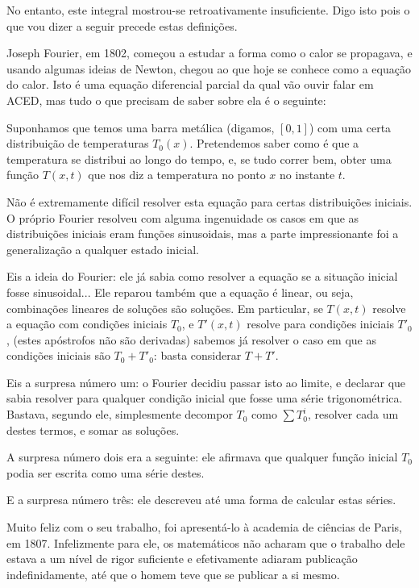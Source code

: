 \documentclass{article}
\begin{document}
No entanto, este integral mostrou-se retroativamente insuficiente. Digo isto pois o que vou dizer a seguir precede estas definições.

Joseph Fourier, em 1802, começou a estudar a forma como o calor se propagava, e usando algumas ideias de Newton, chegou ao que hoje se conhece como a equação do calor. Isto é uma equação diferencial parcial da qual vão ouvir falar em ACED, mas tudo o que precisam de saber sobre ela é o seguinte:

Suponhamos que temos uma barra metálica (digamos, $[0,1]$) com uma certa distribuição de temperaturas $T_0(x)$. Pretendemos saber como é que a temperatura se distribui ao longo do tempo, e, se tudo correr bem, obter uma função $T(x, t)$ que nos diz a temperatura no ponto $x$ no instante $t$.

Não é extremamente difícil resolver esta equação para certas distribuições iniciais. O próprio Fourier resolveu com alguma ingenuidade os casos em que as distribuições iniciais eram funções sinusoidais, mas a parte impressionante foi a generalização a qualquer estado inicial.

Eis a ideia do Fourier: ele já sabia como resolver a equação se a situação inicial fosse sinusoidal... Ele reparou também que a equação é linear, ou seja, combinações lineares de soluções são soluções. Em particular, se $T(x,t)$ resolve a equação com condições iniciais $T_0$, e $T'(x,t)$ resolve para condições iniciais $T'_0$, (estes apóstrofos não são derivadas) sabemos já resolver o caso em que as condições iniciais são $T_0 + T'_0$: basta considerar $T + T'$.

Eis a surpresa número um: o Fourier decidiu passar isto ao limite, e declarar que sabia resolver para qualquer condição inicial que fosse uma série trigonométrica. Bastava, segundo ele, simplesmente decompor $T_0$ como $\sum T^i_0$, resolver cada um destes termos, e somar as soluções.

A surpresa número dois era a seguinte: ele afirmava que qualquer função inicial $T_0$ podia ser escrita como uma série destes.

E a surpresa número três: ele descreveu até uma forma de calcular estas séries.

Muito feliz com o seu trabalho, foi apresentá-lo à academia de ciências de Paris, em 1807. Infelizmente para ele, os matemáticos não acharam que o trabalho dele estava a um nível de rigor suficiente e efetivamente adiaram publicação indefinidamente, até que o homem teve que se publicar a si mesmo.
\end{document}
